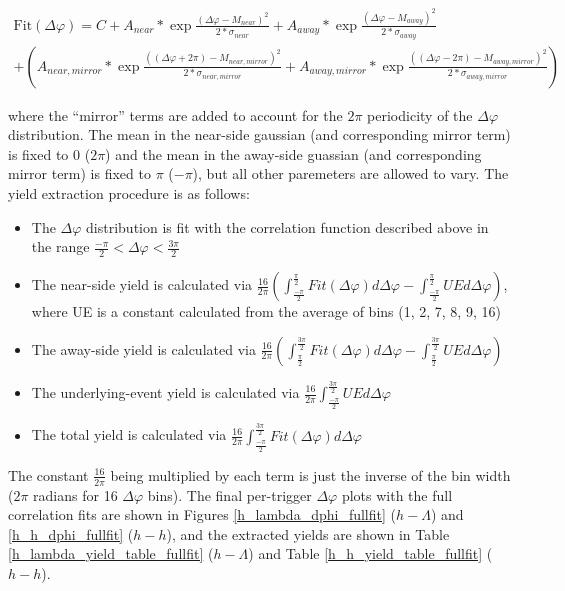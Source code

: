 \documentclass[ALICE,manyauthors]{ALICE_analysis_notes}
\begin{document}
\begin{gather*}
	\text{Fit}(\Delta\varphi) = C + A_{near}*\exp{\frac{(\Delta\varphi - M_{near})^2}{2*\sigma_{near}}} + A_{away}*\exp{\frac{(\Delta\varphi - M_{away})^2}{2*\sigma_{away}}} \\
	+ (A_{near,mirror}*\exp{\frac{((\Delta\varphi+2\pi) - M_{near,mirror})^2}{2*\sigma_{near,mirror}}} + A_{away,mirror}*\exp{\frac{((\Delta\varphi-2\pi) - M_{away,mirror})^2}{2*\sigma_{away,mirror}}})
\end{gather*}

where the ``mirror'' terms are added to account for the $2\pi$ periodicity of the $\Delta\varphi$ distribution. The mean in the near-side gaussian (and corresponding mirror term) is fixed to 0 ($2\pi$) and the mean in the away-side guassian (and corresponding mirror term) is fixed to $\pi$ ($-\pi$), but all other paremeters are allowed to vary. The yield extraction procedure is as follows:

\begin{itemize}
\item The $\Delta\varphi$ distribution is fit with the correlation function described above in the range $\frac{-\pi}{2} < \Delta\varphi < \frac{3\pi}{2}$
\item The near-side yield is calculated via $\frac{16}{2\pi}(\int_{\frac{-\pi}{2}}^{\frac{\pi}{2}}Fit(\Delta\varphi)d\Delta\varphi - \int_{\frac{-\pi}{2}}^{\frac{\pi}{2}}UE d\Delta\varphi)$, where UE is a constant calculated from the average of bins (1, 2, 7, 8, 9, 16)
\item The away-side yield is calculated via $\frac{16}{2\pi}(\int_{\frac{\pi}{2}}^{\frac{3\pi}{2}}Fit(\Delta\varphi)d\Delta\varphi - \int_{\frac{\pi}{2}}^{\frac{3\pi}{2}}UE d\Delta\varphi)$
\item The underlying-event yield is calculated via $\frac{16}{2\pi}\int_{\frac{-\pi}{2}}^{\frac{3\pi}{2}}UE d\Delta\varphi$
\item The total yield is calculated via $\frac{16}{2\pi}\int_{\frac{-\pi}{2}}^{\frac{3\pi}{2}}Fit(\Delta\varphi) d\Delta\varphi$
\end{itemize}

The constant $\frac{16}{2\pi}$ being multiplied by each term is just the inverse of the bin width ($2\pi$ radians for 16 $\Delta\varphi$ bins).
The final per-trigger $\Delta\varphi$ plots with the full correlation fits are shown in Figures \ref{h_lambda_dphi_fullfit} ($h-\Lambda$) and \ref{h_h_dphi_fullfit} ($h-h$), and the extracted yields are shown in Table \ref{h_lambda_yield_table_fullfit} ($h-\Lambda$) and Table \ref{h_h_yield_table_fullfit} ($h-h$). 
\end{document}
